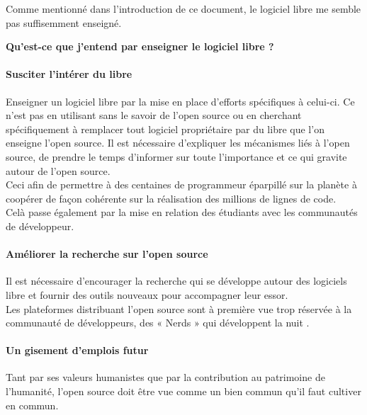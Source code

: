 			Comme mentionné dans l'introduction de ce document, le logiciel libre me semble pas suffisemment enseigné. 

			\textbf{Qu'est-ce que j'entend par enseigner le logiciel libre ?}

			\paragraph{Susciter l'intérer du libre}

			Enseigner un logiciel libre par la mise en place d'efforts spécifiques à celui-ci. Ce n'est pas en utilisant sans le savoir de l'open source ou en cherchant spécifiquement à remplacer tout logiciel propriétaire par du libre que l'on enseigne l'open source. Il est nécessaire d'expliquer les mécanismes liés à l'open source, de prendre le temps d'informer sur toute l'importance et ce qui gravite autour de l'open source.\\
			Ceci afin de permettre à des centaines de programmeur éparpillé sur la planète à coopérer de façon cohérente sur la réalisation des millions de lignes de code.\\

			Celà passe également par la mise en relation des étudiants avec les communautés de développeur.

			\paragraph{Améliorer la recherche sur l'open source\\}

			Il est nécessaire d'encourager la recherche qui se développe autour des logiciels libre et fournir des outils nouveaux pour accompagner leur essor.\\

			Les plateformes distribuant l'open source sont à première vue trop réservée à la communauté de développeurs, des « Nerds » qui développent la nuit .

			\paragraph{Un gisement d'emplois futur\\}

			Tant par ses valeurs humanistes que par la contribution au patrimoine de l'humanité, l'open source doit être vue comme un bien commun qu'il faut cultiver en commun.\\

